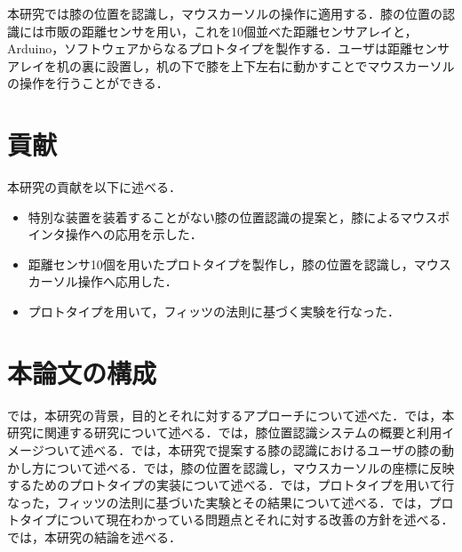 本研究では膝の位置を認識し，マウスカーソルの操作に適用する．膝の位置の認識には市販の距離センサを用い，これを10個並べた距離センサアレイと，Arduino，ソフトウェアからなるプロトタイプを製作する．ユーザは距離センサアレイを机の裏に設置し，机の下で膝を上下左右に動かすことでマウスカーソルの操作を行うことができる．

\section{貢献}
本研究の貢献を以下に述べる．
\begin{itemize}
	\item 特別な装置を装着することがない膝の位置認識の提案と，膝によるマウスポインタ操作への応用を示した．
	\item 距離センサ10個を用いたプロトタイプを製作し，膝の位置を認識し，マウスカーソル操作へ応用した．
	\item プロトタイプを用いて，フィッツの法則に基づく実験を行なった．
\end{itemize}
\section{本論文の構成}
では，本研究の背景，目的とそれに対するアプローチについて述べた．では，本研究に関連する研究について述べる．では，膝位置認識システムの概要と利用イメージついて述べる．では，本研究で提案する膝の認識におけるユーザの膝の動かし方について述べる．では，膝の位置を認識し，マウスカーソルの座標に反映するためのプロトタイプの実装について述べる．では，プロトタイプを用いて行なった，フィッツの法則に基づいた実験とその結果について述べる．では，プロトタイプについて現在わかっている問題点とそれに対する改善の方針を述べる．では，本研究の結論を述べる．

